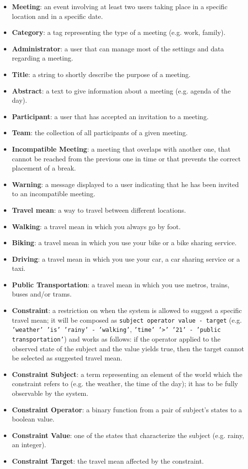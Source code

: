 \begin{itemize}
\item \textbf{Meeting}: an event involving at least two users taking place in a specific location and in a specific date.
\item \textbf{Category}: a tag representing the type of a meeting (e.g. work, family).
\item \textbf{Administrator}: a user that can manage most of the settings and data regarding a meeting.
\item \textbf{Title}: a string to shortly describe the purpose of a meeting.
\item \textbf{Abstract}: a text to give information about a meeting (e.g. agenda of the day).
\item \textbf{Participant}: a user that has accepted an invitation to a meeting.
\item \textbf{Team}: the collection of all participants of a given meeting.

\item \textbf{Incompatible Meeting}: a meeting that overlaps with another one, that cannot be reached from the previous one in time or that prevents the correct placement of a break.
\item \textbf{Warning}: a message displayed to a user indicating that he has been invited to an incompatible meeting.

\item \textbf{Travel mean}: a way to travel between different locations.
\item \textbf{Walking}: a travel mean in which you always go by foot.
\item \textbf{Biking}: a travel mean in which you use your bike or a bike sharing service.
\item \textbf{Driving}: a travel mean in which you use your car, a car sharing service or a taxi.
\item \textbf{Public Transportation}: a travel mean in which you use metros, trains, buses and/or trams.

\item \textbf{Constraint}: a restriction on when the system is allowed to suggest a specific travel mean; it will be composed as \texttt{subject operator value - target} (e.g. \texttt{'weather' 'is' 'rainy' - 'walking'}, \texttt{'time' '>' '21' - 'public transportation'}) and works as follows: if the operator applied to the observed state of the subject and the value yields true, then the target cannot be selected as suggested travel mean.
\item \textbf{Constraint Subject}: a term representing an element of the world which the constraint refers to (e.g. the weather, the time of the day); it has to be fully observable by the system.
\item \textbf{Constraint Operator}: a binary function from a pair of subject's states to a boolean value.
\item \textbf{Constraint Value}: one of the states that characterize the subject (e.g. rainy, an integer).
\item \textbf{Constraint Target}: the travel mean affected by the constraint.


\end{itemize}
